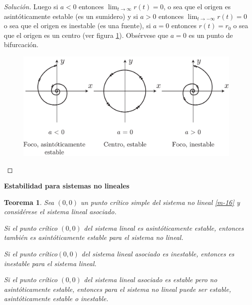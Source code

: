 \documentclass[a5paper,doc,10pt,noapacite]{apa6}
\newtheorem{teorema}{Teorema}
\newcommand{\neodefi}[1]{%
	\vspace{1\baselineskip}
	\textbf{\small#1} \newline
}
\begin{document}
{{\begin{proof}[Solución]
		Luego si \(a<0\) entonces \(\lim_{t\to\infty}r(t)=0\), o sea que el origen es asintóticamente estable (es un sumidero) y si  \(a>0\) entonces \(\lim_{t\to-\infty}r(t)=0\) o sea que el origen es inestable (es una fuente), si \(a=0\) entonces \(r(t)=r_0\) o sea que el origen es un centro (ver figura \ref{fig:M-20}). Obsérvese que \(a=0\) es un punto de bifurcación.	\qedhere
		\vspace{-1\baselineskip}
	\begin{figure}[H]
		\captionsetup{justification=centering, labelfont=footnotesize, font=footnotesize}
		\centering
		\includegraphics[scale=0.35]{Graficos/figura20}
	
		\caption{ }
		\label{fig:M-20}
	\end{figure}
	\end{proof}


%
\neodefi{Estabilidad para sistemas no lineales}

\begin{teorema}\label{teo-7}
	Sea \((0,0)\) un punto crítico simple del sistema no lineal \eqref{m-16} y considérese el sistema lineal
	asociado.
	\begin{APAenumerate}
		\item Si el punto crítico \((0,0)\) del sistema lineal es asintóticamente estable, entonces también es asintóticamente estable para el sistema no lineal.
		\item Si el punto crítico\((0,0)\) del sistema lineal asociado es inestable, entonces es inestable para el sistema lineal.
		\item Si el punto crítico \((0,0)\) del sistema lineal asociado es estable pero no asintóticamente estable, entonces para el sistema no lineal puede ser estable, asintóticamente estable o inestable.
	\end{APAenumerate}
\end{teorema}

}}
\end{document}
